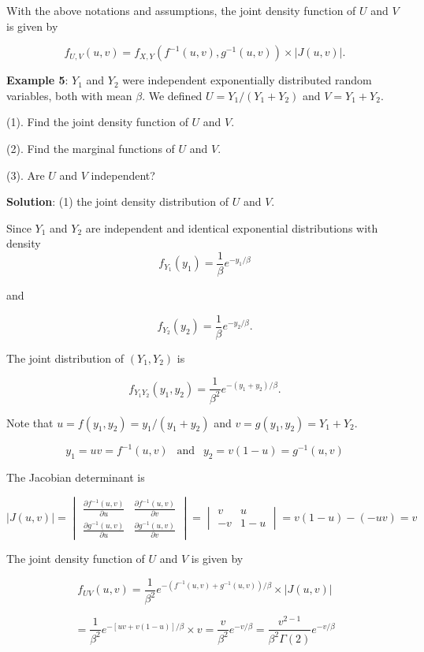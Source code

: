 \documentclass[
]{book}
\begin{document}
With the above notations and assumptions, the joint density function of \(U\) and \(V\) is given by

\[
f_{U,V}(u,v) = f_{X,Y}\left(f^{-1}(u, v), g^{-1}(u, v)\right) \times \Big| J(u, v) \Big|.
\]

\textbf{\color{red} Example 5}: \(Y_1\) and \(Y_2\) were independent exponentially distributed random variables, both with mean \(\beta\). We defined \(U = Y_1/(Y_1 + Y_2)\) and \(V = Y_1 + Y_2\).

(1). Find the joint density function of \(U\) and \(V\).

(2). Find the marginal functions of \(U\) and \(V\).

(3). Are \(U\) and \(V\) independent?

\textbf{Solution}: (1) the joint density distribution of \(U\) and \(V\).

Since \(Y_1\) and \(Y_2\) are independent and identical exponential distributions with density \[
f_{Y_1}(y_1) = \frac{1}{\beta}e^{-y_1/\beta}
\]

and

\[
f_{Y_2}(y_2) = \frac{1}{\beta}e^{-y_2/\beta}.
\]

The joint distribution of \((Y_1, Y_2)\) is

\[
f_{Y_1Y_2}(y_1,y_2) = \frac{1}{\beta^2}e^{-(y_1+y_2)/\beta}.
\]

Note that \(u = f(y_1,y_2)=y_1/(y_1 + y_2)\) and \(v = g(y_1, y_2)=Y_1 + Y_2\).

\[
y_1 =uv = f^{-1}(u,v) \ \ \text{ and } \ \ y_2 = v(1-u) = g^{-1}(u, v)
\]

The Jacobian determinant is

\[
\Big| J(u, v) \Big| = \begin{vmatrix}
\frac{\partial f^{-1}(u, v)}{\partial u} & \frac{\partial f^{-1}(u, v)}{\partial v} \\
\frac{\partial g^{-1}(u, v)}{\partial u} & \frac{\partial g^{-1}(u, v)}{\partial v}  
\end{vmatrix}  = \begin{vmatrix}
v  & u \\
-v & 1-u  
\end{vmatrix} = v(1-u)-(-uv) = v
\]

The joint density function of \(U\) and \(V\) is given by

\[
f_{UV}(u,v) = \frac{1}{\beta^2}e^{-(f^{-1}(u,v)+g^{-1}(u,v))/\beta}\times \Big| J(u, v) \Big|
\]

\[
=\frac{1}{\beta^2}e^{-[uv+v(1-u)]/\beta}\times v = \frac{v}{\beta^2}e^{-v/\beta} = \frac{v^{2-1}}{\beta^2\Gamma(2)}e^{-v/\beta}
\]
\end{document}
